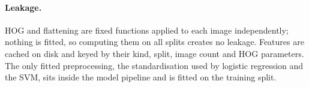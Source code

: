 \paragraph{Leakage.}
HOG and flattening are fixed functions applied to each image independently; nothing is fitted, so computing them on
all splits creates no leakage. Features are cached on disk and keyed by their kind, split, image count and HOG
parameters. The only fitted preprocessing, the standardisation used by logistic regression and the SVM, sits inside the
model pipeline and is fitted on the training split.
